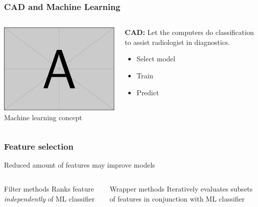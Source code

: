 \documentclass[aspectratio=1610]{beamer}
\begin{document}
\begin{frame}
  \frametitle{\hfill CAD and Machine Learning}
  \begin{columns}[T]
    \begin{column}{.5\textwidth}
      \begin{block}{}
        \includegraphics[width=\textwidth]{images/example-image-a.png}\\
        Machine learning concept
      \end{block}
    \end{column}
    \begin{column}{.5\textwidth}
      \begin{block}{}
        \textbf{CAD:} Let the computers do classification to assist radiologist in diagnostics.
        \begin{itemize}
          \item Select model\pause
          \item Train\pause
          \item Predict\pause
        \end{itemize}
      \end{block}
    \end{column}
  \end{columns}
\end{frame}

\begin{frame}
  \frametitle{\hfill Feature selection}
  Reduced amount of features may improve models\pause
  \begin{columns}[T]
    \begin{column}{.5\textwidth}
      \begin{block}{Filter methods}
        Ranks feature \textit{independently} of ML classifier
      \end{block}
    \end{column}
    \begin{column}{.5\textwidth}
      \begin{block}{Wrapper methods}
        Iteratively evaluates subsets of features in conjunction with ML classifier
      \end{block}
    \end{column}
  \end{columns}
\end{frame}
\end{document}
